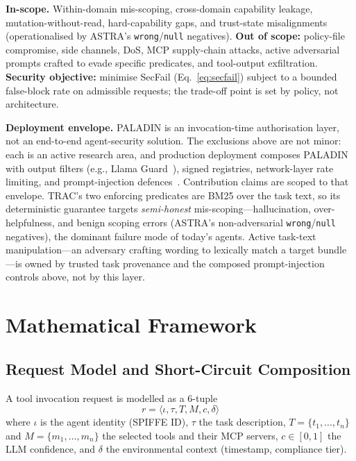 \documentclass[sigconf,review,anonymous]{acmart}
\begin{document}
\textbf{In-scope.} Within-domain mis-scoping, cross-domain capability leakage, mutation-without-read, hard-capability gaps, and trust-state misalignments (operationalised by ASTRA's \texttt{wrong}/\texttt{null} negatives). \textbf{Out of scope:} policy-file compromise, side channels, DoS, MCP supply-chain attacks, active adversarial prompts crafted to evade specific predicates, and tool-output exfiltration. \textbf{Security objective:} minimise SecFail (Eq.~\ref{eq:secfail}) subject to a bounded false-block rate on admissible requests; the trade-off point is set by policy, not architecture.

\textbf{Deployment envelope.} PALADIN is an invocation-time authorisation layer, not an end-to-end agent-security solution. The exclusions above are not minor: each is an active research area, and production deployment composes PALADIN with output filters (e.g., Llama Guard~\cite{inan2023llamaguard}), signed registries, network-layer rate limiting, and prompt-injection defences~\cite{liu2024formalizing}. Contribution claims are scoped to that envelope. TRAC's two enforcing predicates are BM25 over the task text, so its deterministic guarantee targets \emph{semi-honest} mis-scoping---hallucination, over-helpfulness, and benign scoping errors (ASTRA's non-adversarial \texttt{wrong}/\texttt{null} negatives), the dominant failure mode of today's agents. Active task-text manipulation---an adversary crafting wording to lexically match a target bundle---is owned by trusted task provenance and the composed prompt-injection controls above, not by this layer.


\section{Mathematical Framework}
\label{sec:framework}

\subsection{Request Model and Short-Circuit Composition}
\label{sec:request_model}
\label{sec:composition}

A tool invocation request is modelled as a 6-tuple
\begin{equation}
r = \langle \iota, \tau, T, M, c, \delta \rangle
\label{eq:request}
\end{equation}
where $\iota$ is the agent identity (SPIFFE ID), $\tau$ the task description, $T=\{t_1,\dots,t_n\}$ and $M=\{m_1,\dots,m_n\}$ the selected tools and their MCP servers, $c\in[0,1]$ the LLM confidence, and $\delta$ the environmental context (timestamp, compliance tier).
\end{document}
